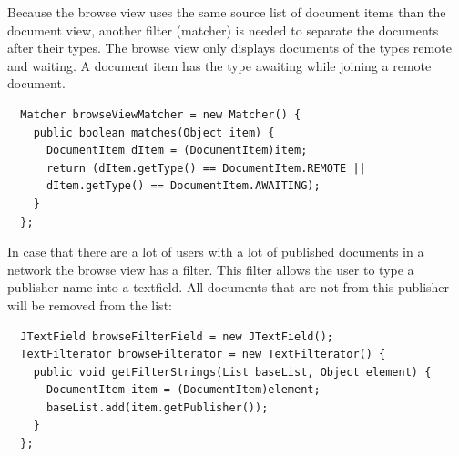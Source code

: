 Because the browse view uses the same source list of document items than the document view, another filter (matcher) is needed to separate the documents after their types. The browse view only displays documents of the types remote and waiting. A document item has the type awaiting while joining a remote document.
\begin{verbatim}
  Matcher browseViewMatcher = new Matcher() {
    public boolean matches(Object item) {
      DocumentItem dItem = (DocumentItem)item;
      return (dItem.getType() == DocumentItem.REMOTE ||
      dItem.getType() == DocumentItem.AWAITING);
    }
  };
\end{verbatim}
In case that there are a lot of users with a lot of published documents in a network the browse view has a filter. This filter allows the user to type a publisher name into a textfield. All documents that are not from this publisher will be removed from the list:
\begin{verbatim}
  JTextField browseFilterField = new JTextField();
  TextFilterator browseFilterator = new TextFilterator() {
    public void getFilterStrings(List baseList, Object element) {
      DocumentItem item = (DocumentItem)element;
      baseList.add(item.getPublisher());
    }
  };
\end{verbatim}

